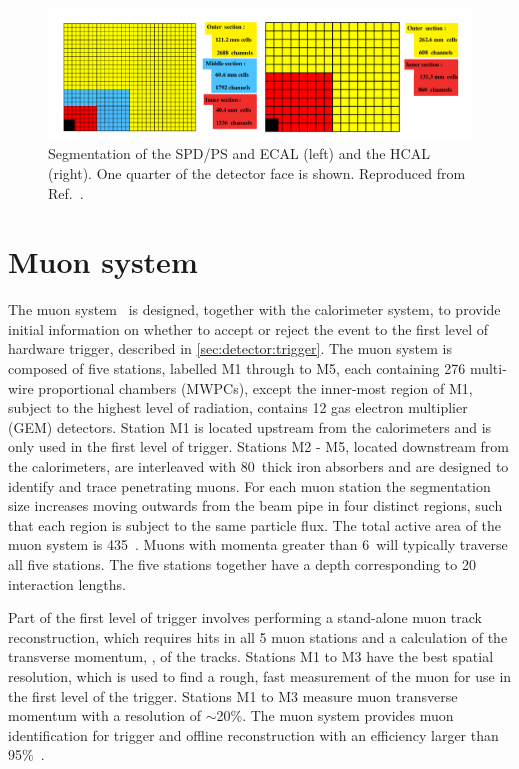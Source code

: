 \begin{figure}
\includegraphics[width=\linewidth]{figures/detector/calorimeters.pdf}
\caption{Segmentation of the SPD/PS and ECAL (left) and the HCAL (right). One quarter of the detector face is shown. Reproduced from Ref.~\cite{lhcbdetector2008}.}
\label{calorimeter}
\end{figure}

\section{Muon system}
\label{sec:detector:muon}

The muon system~\cite{LHCb-DP-2013-001,LHCb-DP-2012-002} is designed, together with the calorimeter system, to provide initial information on whether to accept or reject the event to the first level of hardware trigger, described in \sect\ref{sec:detector:trigger}. The muon system is composed of five stations, labelled M1 through to M5, each containing 276 multi-wire proportional chambers (MWPCs), except the inner-most region of M1, subject to the highest level of radiation, contains 12 gas electron multiplier (GEM) detectors. Station M1 is located upstream from the calorimeters and is only used in the first level of trigger. Stations M2 - M5, located downstream from the calorimeters, are interleaved with 80~\cm thick iron absorbers and are designed to identify and trace penetrating muons. For each muon station the segmentation size increases moving outwards from the beam pipe in four distinct regions, such that each region is subject to the same particle flux. The total active area of the muon system is 435~\ma. Muons with momenta greater than 6~\gevc will typically traverse all five stations. The five stations together have a depth corresponding to 20 interaction lengths. 

Part of the first level of trigger involves performing a stand-alone muon track reconstruction, which requires hits in all 5 muon stations and a calculation of the transverse momentum, \pt, of the tracks. Stations M1 to M3 have the best spatial resolution, which is used to find a rough, fast measurement of the muon \pt for use in the first level of the trigger. Stations M1 to M3 measure muon transverse momentum with a resolution of $\sim$20\%. The muon system provides muon identification for trigger and offline reconstruction with an efficiency larger than 95\%~\cite{LHCb-DP-2014-002}.

